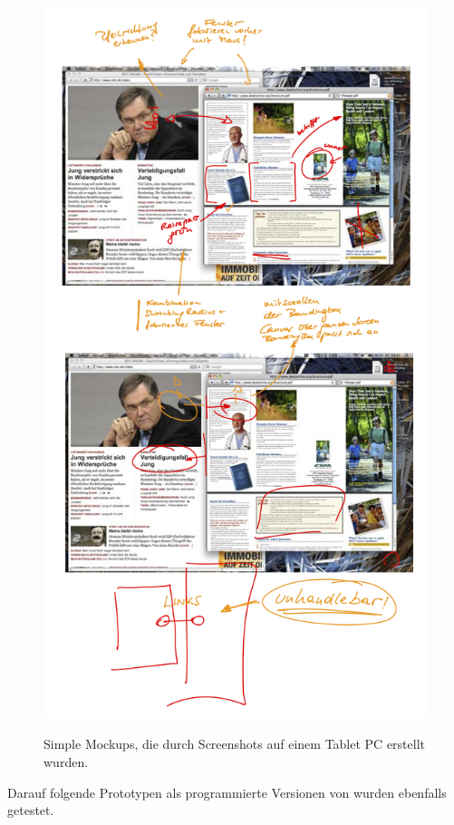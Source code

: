 \begin{figure}
	        {\includegraphics[width=1\linewidth]{gfx/scribblerMockups}}
		\caption[Mockups in Scribbler]{Simple Mockups, die durch Screenshots auf einem Tablet PC erstellt wurden.}\label{fig:scribblerMockups}
\end{figure}

\medskip Darauf folgende Prototypen als programmierte Versionen von \scribbler wurden ebenfalls getestet.

